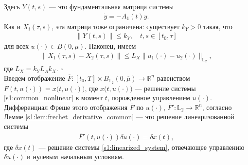 \documentclass[../main.tex]{subfiles}
\begin{document}
Здесь $Y(t,s)$ --- это фундаментальная матрица системы 
\begin{gather*}
 \dot{y} = -A_1(t) y.
\end{gather*}
Как и $X_i(\tau,s)$, эта матрица тоже ограничена: существует $k_Y>0$ такая, что
\begin{gather*}
 \|Y(t,s)\| \leqslant k_Y, \quad t,s \in [t_0, \tau]
\end{gather*}
для всех $u(\cdot) \in B(0,\mu)$.
Наконец, имеем 
\begin{gather*}
 \| X_1(\tau,s) - X_2(\tau,s) \| \leqslant L_X \| u_1(\cdot) - u_2(\cdot) \|_{\mathbb{L}_2}, 
\end{gather*} 
где $ L_X = k_Y L_A k_X$.
\hfill$\square$\\[1ex]%

Введем отображение $\overline{F}: [t_0,T] \times B_{\mathbb{L}_2}(0,\overline{\mu}) \to \mathbb{R}^n$ равенством $\overline{F}(t, u(\cdot)) = x \big(t, u(\cdot)\big) $, где $x \big(t, u(\cdot)\big)$ --- решение системы \eqref{s1:common_nonlinear} в момент $t$, порожденное управлением $u(\cdot)$.
Дифференциал Фреше этого отображения $\overline{F}$ по $u(\cdot)$, $\overline{F}': \mathbb{L}_2 \to \mathbb{R}^n $, согласно Лемме \ref{s1:lem:frechet_derivative_common} --- это решение линеаризованной системы
\begin{gather*}%
 \overline{F}'(t, u(\cdot)) \delta u(\cdot) = \delta x(t), 
\end{gather*}
где $\delta x(t)$ --- решение системы \eqref{s1:linearized_system}, отвечающее управлению $\delta u(\cdot)$ и нулевым начальным условиям.
 
\end{document}
